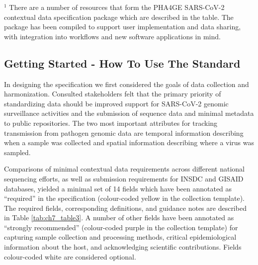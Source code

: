 \begin{table}[]
{\begin{tabular}{@{}ll@{}}
\end{tabular}%
}
\item $^1$ There are a number of resources that form the PHA4GE SARS-CoV-2 contextual data specification package which are described in the table. The package has been compiled to support user implementation and data sharing, with integration into workflows and new software applications in mind.
\end{table}

\subsection{Getting Started - How To Use The Standard}

In designing the specification we first considered the goals of data collection and harmonization. Consulted stakeholders felt that the primary priority of standardizing data should be improved support for SARS-CoV-2 genomic surveillance activities and the submission of sequence data and minimal metadata to public repositories. The two most important attributes for tracking transmission from pathogen genomic data are temporal information describing when a sample was collected and spatial information describing where a virus was sampled.

Comparisons of minimal contextual data requirements across different national sequencing efforts, as well as submission requirements for INSDC and GISAID databases, yielded a minimal set of 14 fields which have been annotated as “required” in the specification (colour-coded yellow in the collection template). The required fields, corresponding definitions, and guidance notes are described in Table \ref{tab:ch7_table3}. A number of other fields have been annotated as “strongly recommended” (colour-coded purple in the collection template) for capturing sample collection and processing methods, critical epidemiological information about the host, and acknowledging scientific contributions. Fields colour-coded white are considered optional. 

